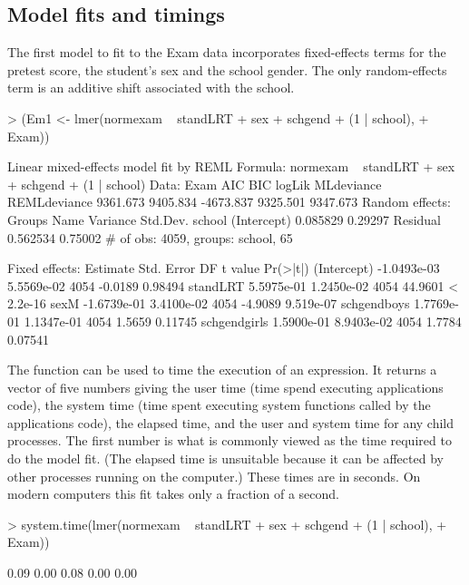 \documentclass[12pt]{article}
\begin{document}
\subsection{Model fits and timings}
\label{sec:ExamFits}

The first model to fit to the Exam data incorporates fixed-effects
terms for the pretest score, the student's sex and the school gender.
The only random-effects term is an additive shift associated with the
school.

\begin{Schunk}
\begin{Sinput}
> (Em1 <- lmer(normexam ~ standLRT + sex + schgend + (1 | school), 
+     Exam))
\end{Sinput}
\begin{Soutput}
Linear mixed-effects model fit by REML
Formula: normexam ~ standLRT + sex + schgend + (1 | school) 
   Data: Exam 
      AIC      BIC    logLik MLdeviance REMLdeviance
 9361.673 9405.834 -4673.837   9325.501     9347.673
Random effects:
 Groups   Name        Variance Std.Dev.
 school   (Intercept) 0.085829 0.29297 
 Residual             0.562534 0.75002 
# of obs: 4059, groups: school, 65

Fixed effects:
                Estimate  Std. Error   DF t value  Pr(>|t|)
(Intercept)  -1.0493e-03  5.5569e-02 4054 -0.0189   0.98494
standLRT      5.5975e-01  1.2450e-02 4054 44.9601 < 2.2e-16
sexM         -1.6739e-01  3.4100e-02 4054 -4.9089 9.519e-07
schgendboys   1.7769e-01  1.1347e-01 4054  1.5659   0.11745
schgendgirls  1.5900e-01  8.9403e-02 4054  1.7784   0.07541
\end{Soutput}
\end{Schunk}

The  function can be used to time the execution of
an \RR{} expression.  It returns a vector of five numbers giving the
user time (time spend executing applications code), the system time
(time spent executing system functions called by the applications
code), the elapsed time, and the user and system time for any child
processes.  The first number is what is commonly viewed as the time
required to do the model fit.  (The elapsed time is unsuitable because
it can be affected by other processes running on the computer.)  These
times are in seconds.  On modern computers this fit takes only a
fraction of a second.

\begin{Schunk}
\begin{Sinput}
> system.time(lmer(normexam ~ standLRT + sex + schgend + (1 | school), 
+     Exam))
\end{Sinput}
\begin{Soutput}
[1] 0.09 0.00 0.08 0.00 0.00
\end{Soutput}
\end{Schunk}
\end{document}
